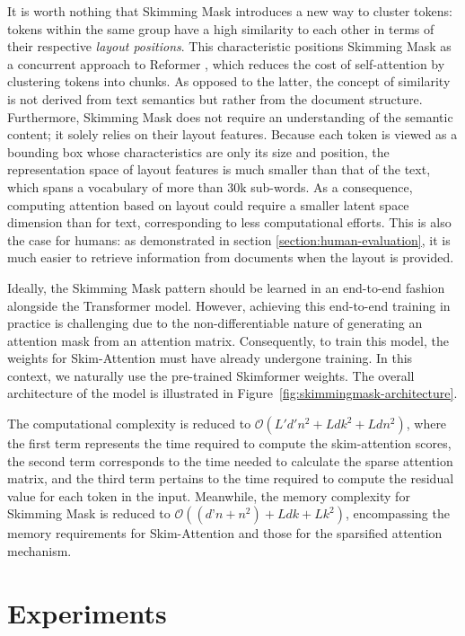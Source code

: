It is worth nothing that Skimming Mask introduces a new way to cluster tokens: tokens within the same group have a high similarity to each other in terms of their respective \emph{layout positions}. This characteristic positions Skimming Mask as a concurrent approach to Reformer \citep{kitaev2020reformer}, which reduces the cost of self-attention by clustering tokens into chunks. As opposed to the latter, the concept of similarity is not derived from text semantics but rather from the document structure. Furthermore, Skimming Mask does not require an understanding of the semantic content; it solely relies on their layout features. Because each token is viewed as a bounding box whose characteristics are only its size and position, the representation space of layout features is much smaller than that of the text, which spans a vocabulary of more than 30k sub-words. As a consequence, computing attention based on layout could require a smaller latent space dimension than for text, corresponding to less computational efforts. This is also the case for humans: as demonstrated in section \ref{section:human-evaluation}, it is much easier to retrieve information from documents when the layout is provided.

Ideally, the Skimming Mask pattern should be learned in an end-to-end fashion alongside the Transformer model. However, achieving this end-to-end training in practice is challenging due to the non-differentiable nature of generating an attention mask from an attention matrix. Consequently, to train this model, the weights for Skim-Attention must have already undergone training. In this context, we naturally use the pre-trained Skimformer weights. The overall architecture of the model is illustrated in Figure~\ref{fig:skimmingmask-architecture}.

The computational complexity is reduced to $\mathcal{O}(L'd'n^2 + Ldk^2 + Ldn^2)$, where the first term represents the time required to compute the skim-attention scores, the second term corresponds to the time needed to calculate the sparse attention matrix, and the third term pertains to the time required to compute the residual value for each token in the input. Meanwhile, the memory complexity for Skimming Mask is reduced to $\mathcal{O}((d’n + n^2) + Ldk + Lk^2)$, encompassing the memory requirements for Skim-Attention and those for the sparsified attention mechanism.

\section{Experiments}

